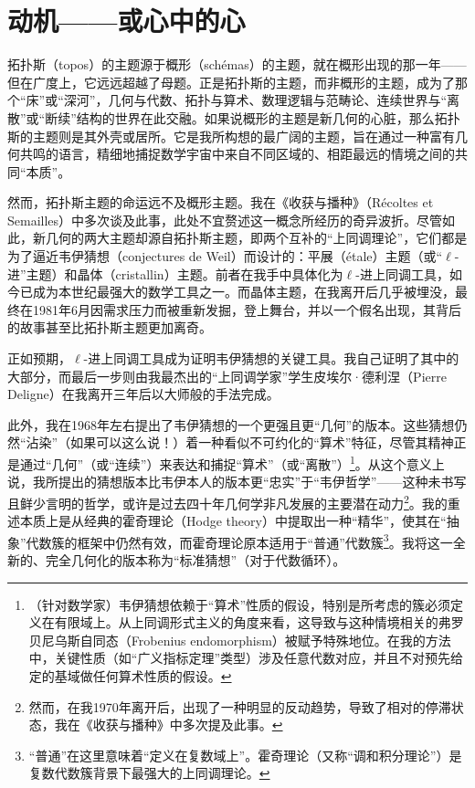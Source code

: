 \section{动机——或心中的心}

拓扑斯（topos）的主题源于概形（schémas）的主题，就在概形出现的那一年——但在广度上，它远远超越了母题。正是拓扑斯的主题，而非概形的主题，成为了那个“床”或“深河”，几何与代数、拓扑与算术、数理逻辑与范畴论、连续世界与“离散”或“断续”结构的世界在此交融。如果说概形的主题是新几何的心脏，那么拓扑斯的主题则是其外壳或居所。它是我所构想的最广阔的主题，旨在通过一种富有几何共鸣的语言，精细地捕捉数学宇宙中来自不同区域的、相距最远的情境之间的共同“本质”。

然而，拓扑斯主题的命运远不及概形主题。我在《收获与播种》（Récoltes et Semailles）中多次谈及此事，此处不宜赘述这一概念所经历的奇异波折。尽管如此，新几何的两大主题却源自拓扑斯主题，即两个互补的“上同调理论”，它们都是为了逼近韦伊猜想（conjectures de Weil）而设计的：平展（étale）主题（或“$\ell$-进”主题）和晶体（cristallin）主题。前者在我手中具体化为$\ell$-进上同调工具，如今已成为本世纪最强大的数学工具之一。而晶体主题，在我离开后几乎被埋没，最终在1981年6月因需求压力而被重新发掘，登上舞台，并以一个假名出现，其背后的故事甚至比拓扑斯主题更加离奇。

正如预期，$\ell$-进上同调工具成为证明韦伊猜想的关键工具。我自己证明了其中的大部分，而最后一步则由我最杰出的“上同调学家”学生皮埃尔·德利涅（Pierre Deligne）在我离开三年后以大师般的手法完成。

此外，我在1968年左右提出了韦伊猜想的一个更强且更“几何”的版本。这些猜想仍然“沾染”（如果可以这么说！）着一种看似不可约化的“算术”特征，尽管其精神正是通过“几何”（或“连续”）来表达和捕捉“算术”（或“离散”）\footnote{（针对数学家）韦伊猜想依赖于“算术”性质的假设，特别是所考虑的簇必须定义在有限域上。从上同调形式主义的角度来看，这导致与这种情境相关的弗罗贝尼乌斯自同态（Frobenius endomorphism）被赋予特殊地位。在我的方法中，关键性质（如“广义指标定理”类型）涉及任意代数对应，并且不对预先给定的基域做任何算术性质的假设。}。从这个意义上说，我所提出的猜想版本比韦伊本人的版本更“忠实”于“韦伊哲学”——这种未书写且鲜少言明的哲学，或许是过去四十年几何学非凡发展的主要潜在动力\footnote{然而，在我1970年离开后，出现了一种明显的反动趋势，导致了相对的停滞状态，我在《收获与播种》中多次提及此事。}。我的重述本质上是从经典的霍奇理论（Hodge theory）中提取出一种“精华”，使其在“抽象”代数簇的框架中仍然有效，而霍奇理论原本适用于“普通”代数簇\footnote{“普通”在这里意味着“定义在复数域上”。霍奇理论（又称“调和积分理论”）是复数代数簇背景下最强大的上同调理论。}。我将这一全新的、完全几何化的版本称为“标准猜想”（对于代数循环）。

